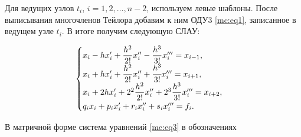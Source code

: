 Для ведущих узлов $t_i$, $i=1,  2,  \dots,  n-2$, используем левые шаблоны. После выписывания многочленов Тейлора добавим к ним ОДУ3 \eqref{mc:eq1}, записанное в ведущем узле $   t_i$. В итоге получим следующую СЛАУ:



\begin{equation}

\label{mc:eq3}

\begin{cases}

x_i-h x'_i+\dfrac{h^{2}}{2!} x_{i}''-\dfrac{h^{3}}{3!} x_{i}'''=x_{i-1},

\\[1mm]

x_i+h x'_i+\dfrac{h^{2}}{2!} x_{i}''+\cfrac{h^{3}}{3!} x_{i}'''=x_{i+1},

\\[1mm]

x_i+2 h x'_i+2^2 \dfrac{h^{2}}{2!} x_{i}''+2^3 \dfrac{h^{3}}{3!} x_{i}'''=x_{i+2},

\\[1mm]

q_i x_i+p_i x'_i+r_i x''_i+s_i x'''_i=f_i.

\end{cases}

\end{equation}



В матричной форме система уравнений \eqref{mc:eq3}   в обозначениях



